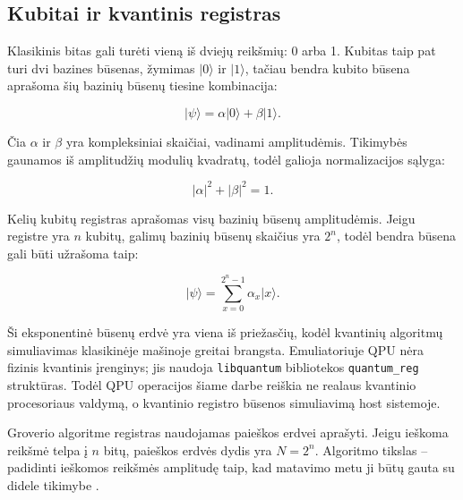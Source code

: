 \subsection{Kubitai ir kvantinis registras}
\label{sec:kubitai-ir-kvantinis-registras}

Klasikinis bitas gali turėti vieną iš dviejų reikšmių: 0 arba 1. Kubitas taip pat turi dvi bazines būsenas, žymimas $\lvert 0 \rangle$ ir $\lvert 1 \rangle$, tačiau bendra kubito būsena aprašoma šių bazinių būsenų tiesine kombinacija:

\begin{equation}
    \lvert \psi \rangle = \alpha \lvert 0 \rangle + \beta \lvert 1 \rangle.
\end{equation}

Čia $\alpha$ ir $\beta$ yra kompleksiniai skaičiai, vadinami amplitudėmis. Tikimybės gaunamos iš amplitudžių modulių kvadratų, todėl galioja normalizacijos sąlyga:

\begin{equation}
    \lvert \alpha \rvert^2 + \lvert \beta \rvert^2 = 1.
\end{equation}

Kelių kubitų registras aprašomas visų bazinių būsenų amplitudėmis. Jeigu registre yra $n$ kubitų, galimų bazinių būsenų skaičius yra $2^n$, todėl bendra būsena gali būti užrašoma taip:

\begin{equation}
    \lvert \psi \rangle = \sum_{x=0}^{2^n-1} \alpha_x \lvert x \rangle.
\end{equation}

Ši eksponentinė būsenų erdvė yra viena iš priežasčių, kodėl kvantinių algoritmų simuliavimas klasikinėje mašinoje greitai brangsta. Emuliatoriuje QPU nėra fizinis kvantinis įrenginys; jis naudoja \texttt{libquantum} bibliotekos \texttt{quantum\_reg} struktūras. Todėl QPU operacijos šiame darbe reiškia ne realaus kvantinio procesoriaus valdymą, o kvantinio registro būsenos simuliavimą host sistemoje.

Groverio algoritme registras naudojamas paieškos erdvei aprašyti. Jeigu ieškoma reikšmė telpa į $n$ bitų, paieškos erdvės dydis yra $N = 2^n$. Algoritmo tikslas -- padidinti ieškomos reikšmės amplitudę taip, kad matavimo metu ji būtų gauta su didele tikimybe \cite{grover-1996}.
